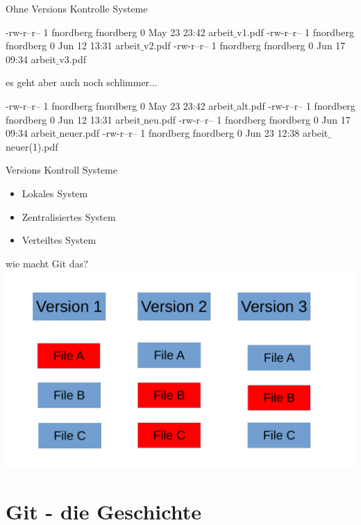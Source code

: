 \documentclass{beamer}
\begin{document}
\begin{frame}{Ohne Versions Kontrolle Systeme} 

-rw-r--r-- 1 fnordberg fnordberg 0 May 23 23:42 arbeit$\_$v1.pdf
-rw-r--r-- 1 fnordberg fnordberg 0 Jun 12 13:31 arbeit$\_$v2.pdf
-rw-r--r-- 1 fnordberg fnordberg 0 Jun 17 09:34 arbeit$\_$v3.pdf

\end{frame}

\begin{frame}{es geht aber auch noch schlimmer...}

-rw-r--r-- 1 fnordberg fnordberg 0 May 23 23:42 arbeit$\_$alt.pdf
-rw-r--r-- 1 fnordberg fnordberg 0 Jun 12 13:31 arbeit$\_$neu.pdf
-rw-r--r-- 1 fnordberg fnordberg 0 Jun 17 09:34 arbeit$\_$neuer.pdf
-rw-r--r-- 1 fnordberg fnordberg 0 Jun 23 12:38 arbeit$\_$neuer(1).pdf

\end{frame}

\begin{frame}{Versions Kontroll Systeme}
    
    \begin{itemize}
        \item Lokales System
        \item Zentralisiertes System
        \item Verteiltes System
    \end{itemize}
\end{frame}
\begin{frame}{wie macht Git das?}
 \includegraphics[scale=0.4]{pictures/git-versionen.pdf}   
\end{frame}


\section{Git - die Geschichte}
\end{document}
